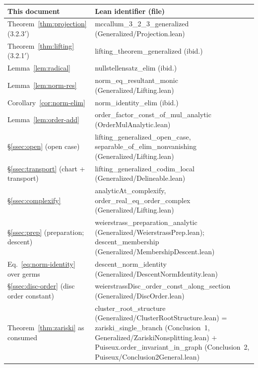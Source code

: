 \documentclass[11pt,a4paper]{article}
\theoremstyle{plain}
\theoremstyle{definition}
\newcommand{\code}[1]{{\ttfamily\small #1}}
\begin{document}
\begin{center}
\renewcommand{\arraystretch}{1.2}
\small
\begin{tabular}{|p{6.0cm}|p{8.4cm}|}
\hline
\textbf{This document} & \textbf{Lean identifier (file)} \\
\hline
Theorem~\ref{thm:projection} (3.2.3$'$) &
\code{mccallum\_3\_2\_3\_generalized} (\code{Generalized/Projection.lean}) \\
\hline
Theorem~\ref{thm:lifting} (3.2.1$'$) &
\code{lifting\_theorem\_generalized} (ibid.) \\
\hline
Lemma~\ref{lem:radical} &
\code{nullstellensatz\_elim} (ibid.) \\
\hline
Lemma~\ref{lem:norm-res} &
\code{norm\_eq\_resultant\_monic} (\code{Generalized/Lifting.lean}) \\
\hline
Corollary~\ref{cor:norm-elim} &
\code{norm\_identity\_elim} (ibid.) \\
\hline
Lemma~\ref{lem:order-add} &
\code{order\_factor\_const\_of\_mul\_analytic} (\code{OrderMulAnalytic.lean}) \\
\hline
\S\ref{ssec:open} (open case) &
\code{lifting\_generalized\_open\_case},
\code{separable\_of\_elim\_nonvanishing} (\code{Generalized/Lifting.lean}) \\
\hline
\S\ref{ssec:transport} (chart + transport) &
\code{lifting\_generalized\_codim\_local} (\code{Generalized/Delineable.lean}) \\
\hline
\S\ref{ssec:complexify} &
\code{analyticAt\_complexify}, \code{order\_real\_eq\_order\_complex}
(\code{Generalized/Lifting.lean}) \\
\hline
\S\ref{ssec:prep} (preparation; descent) &
\code{weierstrass\_preparation\_analytic} (\code{Generalized/WeierstrassPrep.lean});
\code{descent\_membership} (\code{Generalized/MembershipDescent.lean}) \\
\hline
Eq.~\eqref{eq:norm-identity} over germs &
\code{descent\_norm\_identity} (\code{Generalized/DescentNormIdentity.lean}) \\
\hline
\S\ref{ssec:disc-order} (disc order constant) &
\code{weierstrassDisc\_order\_const\_along\_section}
(\code{Generalized/DiscOrder.lean}) \\
\hline
Theorem~\ref{thm:zariski} as consumed &
\code{cluster\_root\_structure} (\code{Generalized/ClusterRootStructure.lean})
= \code{zariski\_single\_branch} (Conclusion~1,
\code{Generalized/ZariskiNonsplitting.lean}) $+$
\code{Puiseux.order\_invariant\_in\_graph} (Conclusion~2,
\code{Puiseux/Conclusion2General.lean}) \\

\end{tabular}
\end{center}
\end{document}
